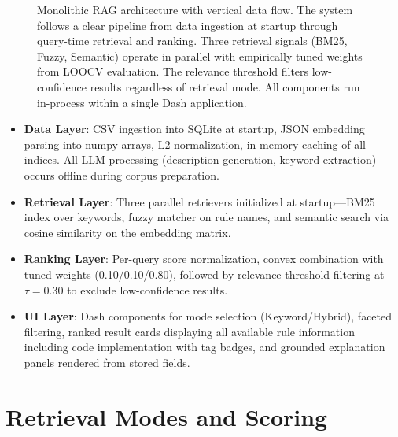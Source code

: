 \begin{figure}[H]
\caption{Monolithic RAG architecture with vertical data flow. The system follows a clear pipeline from data ingestion at startup through query-time retrieval and ranking. Three retrieval signals (BM25, Fuzzy, Semantic) operate in parallel with empirically tuned weights from LOOCV evaluation. The relevance threshold filters low-confidence results regardless of retrieval mode. All components run in-process within a single Dash application.}\label{fig:intro-architecture}
\end{figure}

\begin{itemize}[leftmargin=*,itemsep=2pt,topsep=2pt]
 \item \textbf{Data Layer}: CSV ingestion into SQLite at startup, JSON embedding parsing into numpy arrays, L2 normalization, in-memory caching of all indices. All LLM processing (description generation, keyword extraction) occurs offline during corpus preparation.
 \item \textbf{Retrieval Layer}: Three parallel retrievers initialized at startup—BM25 index \cite{robertson2009bm25} over keywords, fuzzy matcher \cite{fuzzywuzzy2011} on rule names, and semantic search via cosine similarity on the embedding matrix. 
 \item \textbf{Ranking Layer}: Per-query score normalization, convex combination with tuned weights (0.10/0.10/0.80), followed by relevance threshold filtering at $\tau=0.30$ to exclude low-confidence results.
 \item \textbf{UI Layer}: Dash components for mode selection (Keyword/Hybrid), faceted filtering, ranked result cards displaying all available rule information including code implementation with tag badges, and grounded explanation panels rendered from stored fields.
\end{itemize}

\section{Retrieval Modes and Scoring}

